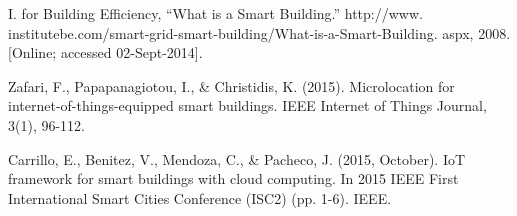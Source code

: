 \documentclass[conference]{IEEEtran}
\begin{document}
\begin{thebibliography}{00}
I. for Building Efficiency, “What is a Smart Building.” http://www.
institutebe.com/smart-grid-smart-building/What-is-a-Smart-Building.
aspx, 2008. [Online; accessed 02-Sept-2014].


Zafari, F., Papapanagiotou, I., \& Christidis, K. (2015). Microlocation for internet-of-things-equipped smart buildings. IEEE Internet of Things Journal, 3(1), 96-112.


 Carrillo, E., Benitez, V., Mendoza, C., \& Pacheco, J. (2015, October). IoT framework for smart buildings with cloud computing. In 2015 IEEE First International Smart Cities Conference (ISC2) (pp. 1-6). IEEE.

\end{thebibliography}
\end{document}
